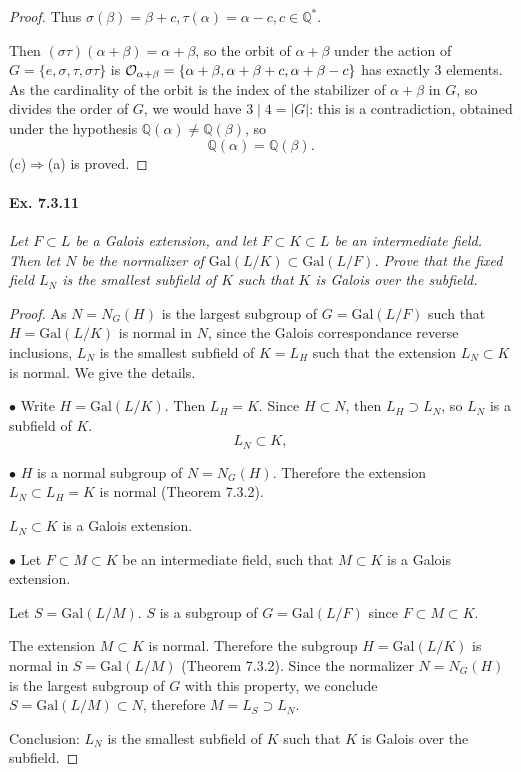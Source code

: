 \documentclass[11pt,a4paper]{article}
\newcommand{\Q}{\mathbb{Q}}
\newcommand{\Gal}{\mathrm{Gal}}
\begin{document}
\begin{proof}
Thus $\sigma(\beta) = \beta+c, \tau(\alpha) = \alpha-c, c\in \Q^*$.

Then $(\sigma\tau)(\alpha+ \beta) = \alpha+\beta$, so the orbit of $\alpha + \beta$ under the action of $G = \{e,\sigma, \tau, \sigma \tau\}$ is ${\cal O}_{\alpha+\beta} =\{ \alpha+\beta, \alpha+\beta+c,\alpha+\beta-c\}$ has exactly 3 elements. As the cardinality of the orbit is the index of the stabilizer of $\alpha+ \beta$ in $G$, so divides the order of $G$, we would have $3 \mid 4 = \vert G \vert$: this is a contradiction, obtained under the hypothesis $\Q(\alpha) \neq \Q(\beta)$, so
$$\Q(\alpha) = \Q(\beta).$$
(c)$\Rightarrow$(a) is proved.


\end{proof}

\paragraph{Ex. 7.3.11}

{\it Let $F\subset L$ be a Galois extension, and let $F\subset K \subset L$ be an intermediate field. Then let $N$ be the normalizer of $\Gal(L/K) \subset \Gal(L/F)$. Prove that the fixed field $L_N$ is the smallest subfield of $K$ such that $K$ is Galois over the subfield.
}

\begin{proof} As $N = N_G(H)$ is the largest subgroup of $G = \Gal(L/F)$ such that $H = \Gal(L/K)$ is normal in $N$, since the Galois correspondance reverse inclusions, $L_N$ is the smallest subfield of $K = L_H$ such that the extension $L_N \subset K$ is normal. We give the details.

$\bullet$  Write $H = \Gal(L/K)$. Then $L_H = K$. Since $H \subset N$, then $L_H \supset L_N$, so $L_N$ is a subfield of $K$.
$$L_N \subset K,$$

$\bullet$ 
$H$ is a normal subgroup of $N = N_G(H)$. Therefore the extension $L_N \subset L_H = K$ is normal (Theorem 7.3.2).
\begin{center}
$L_N \subset K$ is a Galois extension.
\end{center}

$\bullet$ 
Let  $F \subset M \subset K$ be an intermediate field,  such that $M \subset K$ is a Galois extension.

Let $S = \Gal(L/M)$. $S$ is a subgroup of $G=\Gal(L/F)$ since $ F \subset M \subset K$.

The extension $M \subset K$ is normal. Therefore the subgroup $H = \Gal(L/K)$ is normal in $S = \Gal(L/M)$ (Theorem 7.3.2). Since the normalizer $N = N_G(H)$ is the largest subgroup of $G$ with this property, we conclude 
$S = \Gal(L/M) \subset N$, therefore $M = L_S \supset L_N$.

\bigskip

Conclusion: $L_N$ is the smallest subfield of $K$ such that $K$ is Galois over the subfield.
\end{proof}
\end{document}
